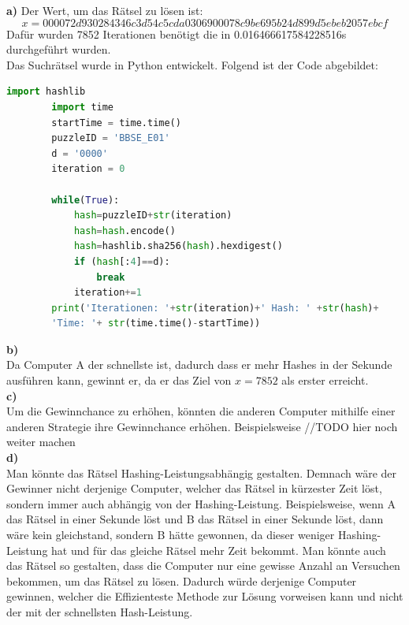 \documentclass[german]{../uebung}
\begin{document}
\begin{exercise}{4}\textbf{a)}
    Der Wert, um das Rätsel zu lösen ist: \[x=000072d930284346c3d54c5cda0306900078c9be695b24d899d5ebeb2057ebcf\] Dafür wurden 7852 Iterationen benötigt die in 0.016466617584228516s durchgeführt wurden.\\
    Das Suchrätsel wurde in Python entwickelt. Folgend ist der Code abgebildet:
    \begin{lstlisting}[language=Python]
        import hashlib 
        import time 
        startTime = time.time() 
        puzzleID = 'BBSE_E01' 
        d = '0000'
        iteration = 0
        
        while(True):
            hash=puzzleID+str(iteration)
            hash=hash.encode()
            hash=hashlib.sha256(hash).hexdigest()
            if (hash[:4]==d):
                break
            iteration+=1
        print('Iterationen: '+str(iteration)+' Hash: ' +str(hash)+
        'Time: '+ str(time.time()-startTime))
    \end{lstlisting}
    \textbf{b)}\\
    Da Computer A der schnellste ist, dadurch dass er mehr Hashes in der Sekunde ausführen kann, gewinnt er, da er das Ziel von \(x=7852\) als erster erreicht.\\
    \textbf{c)}\\
    Um die Gewinnchance zu erhöhen, könnten die anderen Computer mithilfe einer anderen Strategie ihre Gewinnchance erhöhen. Beispielsweise //TODO hier noch weiter machen \\
    \textbf{d)}\\
    Man könnte das Rätsel Hashing-Leistungsabhängig gestalten. Demnach wäre der Gewinner nicht derjenige Computer, welcher das Rätsel in kürzester Zeit löst, sondern immer auch abhängig von der Hashing-Leistung. Beispielsweise, wenn A das Rätsel in einer Sekunde löst und B das Rätsel in einer Sekunde löst, dann wäre kein gleichstand, sondern B hätte gewonnen, da dieser weniger Hashing-Leistung hat und für das gleiche Rätsel mehr Zeit bekommt.
    Man könnte auch das Rätsel so gestalten, dass die Computer nur eine gewisse Anzahl an Versuchen bekommen, um das Rätsel zu lösen. Dadurch würde derjenige Computer gewinnen, welcher die Effizienteste Methode zur Lösung vorweisen kann und nicht der mit der schnellsten Hash-Leistung.\\
\end{exercise}\\
\end{document}
